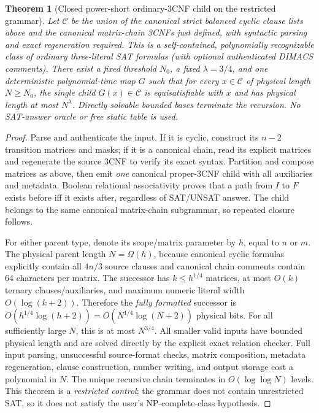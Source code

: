 \documentclass[11pt]{article}
\newtheorem{theorem}{Theorem}
\begin{document}
\begin{theorem}[Closed power-short ordinary-3CNF child on the restricted grammar]
Let $\mathcal C$ be the union of the canonical strict balanced cyclic clause lists above and the canonical matrix-chain 3CNFs just defined, with syntactic parsing and exact regeneration required. This is a self-contained, polynomially recognizable class of \emph{ordinary three-literal SAT formulas} (with optional authenticated DIMACS comments). There exist a fixed threshold $N_0$, a fixed $\lambda=3/4$, and one deterministic polynomial-time map $G$ such that for every $x\in\mathcal C$ of physical length $N\ge N_0$, the single child $G(x)\in\mathcal C$ is equisatisfiable with $x$ and has physical length at most $N^\lambda$. Directly solvable bounded bases terminate the recursion. No SAT-answer oracle or free static table is used.
\end{theorem}
\begin{proof}
Parse and authenticate the input. If it is cyclic, construct its $n-2$ transition matrices and masks; if it is a canonical chain, read its explicit matrices and regenerate the source 3CNF to verify its exact syntax. Partition and compose matrices as above, then emit \emph{one} canonical proper-3CNF child with all auxiliaries and metadata. Boolean relational associativity proves that a path from $I$ to $F$ exists before iff it exists after, regardless of SAT/UNSAT answer. The child belongs to the same canonical matrix-chain subgrammar, so repeated closure follows.

For either parent type, denote its scope/matrix parameter by $h$, equal to $n$ or $m$. The physical parent length $N=\Omega(h)$, because canonical cyclic formulas explicitly contain all $4n/3$ source clauses and canonical chain comments contain 64 characters per matrix. The successor has $k\le h^{1/4}$ matrices, at most $O(k)$ ternary clauses/auxiliaries, and maximum numeric literal width $O(\log(k+2))$. Therefore the \emph{fully formatted} successor is $O(h^{1/4}\log(h+2))=O(N^{1/4}\log(N+2))$ physical bits. For all sufficiently large $N$, this is at most $N^{3/4}$. All smaller valid inputs have bounded physical length and are solved directly by the explicit exact relation checker. Full input parsing, unsuccessful source-format checks, matrix composition, metadata regeneration, clause construction, number writing, and output storage cost a polynomial in $N$. The unique recursive chain terminates in $O(\log\log N)$ levels. This theorem is a \emph{restricted control}; the grammar does not contain unrestricted SAT, so it does not satisfy the user's NP-complete-class hypothesis.
\end{proof}
\end{document}
